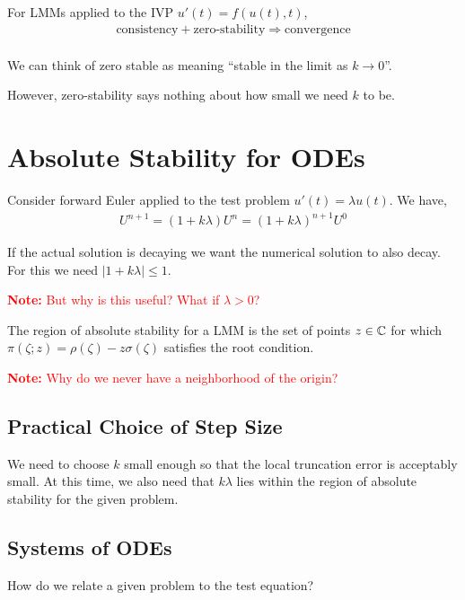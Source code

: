 \documentclass[12pt]{article}
\newcommand{\note}[1]{\textcolor{red}{\textbf{Note:} #1}}
\begin{document}
\begin{theorem}
For LMMs applied to the IVP \( u'(t) = f(u(t),t) \),
\begin{align*}
    \text{consistency} + \text{zero-stability} \Longrightarrow \text{convergence} \\
\end{align*}
\end{theorem}

We can think of zero stable as meaning ``stable in the limit as \( k\to 0 \)''.

However, zero-stability says nothing about how small we need \( k \) to be. 

\section{Absolute Stability for ODEs}

Consider forward Euler applied to the test problem \( u'(t) = \lambda u(t) \). We have,
\begin{align*}
    U^{n+1}=(1+k\lambda)U^n = (1+k\lambda)^{n+1} U^0
\end{align*}

If the actual solution is decaying we want the numerical solution to also decay. For this we need \( |1+k\lambda| \leq 1 \).

\note{But why is this useful? What if \( \lambda > 0 \)?}

\begin{definition}
The region of absolute stability for a LMM is the set of points \( z\in\mathbb{C} \) for which \( \pi(\zeta;z) = \rho(\zeta) - z\sigma(\zeta) \) satisfies the root condition.
\end{definition}

\note{Why do we never have a neighborhood of the origin?}

\subsection{Practical Choice of Step Size}

We need to choose \( k \) small enough so that the local truncation error is acceptably small. At this time, we also need that \( k\lambda \) lies within the region of absolute stability for the given problem.

\subsection{Systems of ODEs}
How do we relate a given problem to the test equation?
\end{document}
